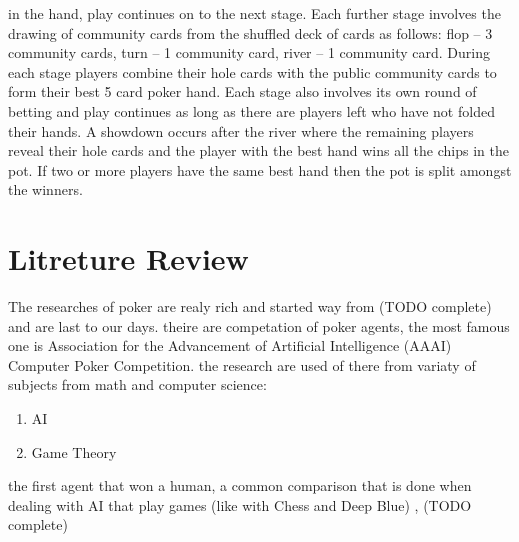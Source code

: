 \documentclass{article}
\begin{document}
in the hand, play continues on to the next stage. Each further stage involves the drawing of community cards from the
shuffled deck of cards as follows: flop – 3 community cards, turn – 1 community card, river – 1 community card.
During each stage players combine their hole cards with the public community cards to form their best 5 card poker
hand. Each stage also involves its own round of betting and play continues as long as there are players left who have not
folded their hands. A showdown occurs after the river where the remaining players reveal their hole cards and the player
with the best hand wins all the chips in the pot. If two or more players have the same best hand then the pot is split
amongst the winners.
\section{Litreture Review}
The researches of poker are realy rich and started way from (TODO complete) and are last to our days.
theire are competation of poker agents, the most famous one is Association for the Advancement of Artificial Intelligence (AAAI) Computer Poker Competition.
the research are used of there from variaty of subjects from math and computer science:
\begin{enumerate}
\item AI
\item Game Theory
\end{enumerate}
the first agent that won a human, a common comparison that is done when dealing with AI that play games (like with Chess and Deep Blue) , (TODO complete)
\end{document}
